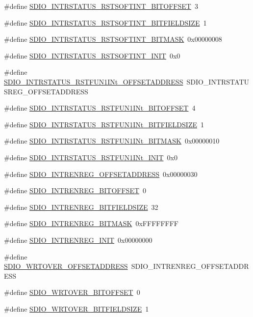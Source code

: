 \begin{DoxyCompactItemize}
\item 
\#define \hyperlink{a00571_ae7f5e0778367437ecc4660975541c96c}{SDIO\_\-INTRSTATUS\_\-RSTSOFTINT\_\-BITOFFSET}~3
\item 
\#define \hyperlink{a00571_a402228dde6bd097f475e2def103d11c6}{SDIO\_\-INTRSTATUS\_\-RSTSOFTINT\_\-BITFIELDSIZE}~1
\item 
\#define \hyperlink{a00571_a83b3ee84f8c00f8e56151c8305b93dfb}{SDIO\_\-INTRSTATUS\_\-RSTSOFTINT\_\-BITMASK}~0x00000008
\item 
\#define \hyperlink{a00571_a75efdce1899e53f98be39c0a74194b46}{SDIO\_\-INTRSTATUS\_\-RSTSOFTINT\_\-INIT}~0x0
\item 
\#define \hyperlink{a00571_ac222cc61fbe5c7777c19fc3137c6f15b}{SDIO\_\-INTRSTATUS\_\-RSTFUN1INt\_\-OFFSETADDRESS}~SDIO\_\-INTRSTATUSREG\_\-OFFSETADDRESS
\item 
\#define \hyperlink{a00571_a9cd19a5ef9b9ee4775be4e7304ab83fd}{SDIO\_\-INTRSTATUS\_\-RSTFUN1INt\_\-BITOFFSET}~4
\item 
\#define \hyperlink{a00571_a36eccd22e7125cf8ab7e10e3ab125a64}{SDIO\_\-INTRSTATUS\_\-RSTFUN1INt\_\-BITFIELDSIZE}~1
\item 
\#define \hyperlink{a00571_a4d0943f174648e403ea7e8f920c7330b}{SDIO\_\-INTRSTATUS\_\-RSTFUN1INt\_\-BITMASK}~0x00000010
\item 
\#define \hyperlink{a00571_ae5abdf62f9a46039c0876bc0c1b4c5b7}{SDIO\_\-INTRSTATUS\_\-RSTFUN1INt\_\-INIT}~0x0
\item 
\#define \hyperlink{a00571_af92f0da48c429ee4f6dd5c5702d4a14f}{SDIO\_\-INTRENREG\_\-OFFSETADDRESS}~0x00000030
\item 
\#define \hyperlink{a00571_aaf4706adb30c171ced22c719b9d54dc1}{SDIO\_\-INTRENREG\_\-BITOFFSET}~0
\item 
\#define \hyperlink{a00571_a96fda0197bef1021ca326474436a92ce}{SDIO\_\-INTRENREG\_\-BITFIELDSIZE}~32
\item 
\#define \hyperlink{a00571_ad2ffe4a1e1b4c88fd2c5e81066b67c7b}{SDIO\_\-INTRENREG\_\-BITMASK}~0xFFFFFFFF
\item 
\#define \hyperlink{a00571_a100d4951e1ae19b0144c43aca5845b8b}{SDIO\_\-INTRENREG\_\-INIT}~0x00000000
\item 
\#define \hyperlink{a00571_ab93f47f1a7fb0e2e2701c1ae82040e51}{SDIO\_\-WRTOVER\_\-OFFSETADDRESS}~SDIO\_\-INTRENREG\_\-OFFSETADDRESS
\item 
\#define \hyperlink{a00571_a9404a2594c30cf67ccecdf2f1994be02}{SDIO\_\-WRTOVER\_\-BITOFFSET}~0
\item 
\#define \hyperlink{a00571_aee3d4b9d8273eac7dac60df4455a2771}{SDIO\_\-WRTOVER\_\-BITFIELDSIZE}~1

\end{DoxyCompactItemize}
